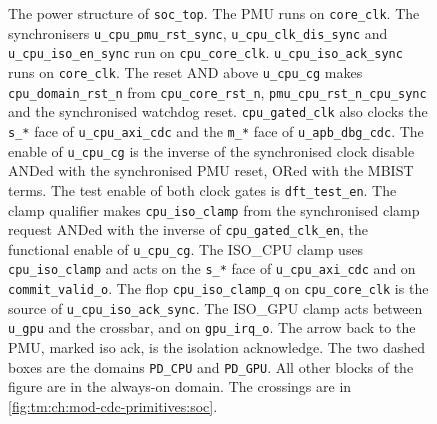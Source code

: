 \begin{figure}[ht]
{}
  \caption{The power structure of \texttt{soc\_top}. The PMU runs on \texttt{core\_clk}. The synchronisers \texttt{u\_cpu\_pmu\_rst\_sync}, \texttt{u\_cpu\_clk\_dis\_sync} and \texttt{u\_cpu\_iso\_en\_sync} run on \texttt{cpu\_core\_clk}. \texttt{u\_cpu\_iso\_ack\_sync} runs on \texttt{core\_clk}. The reset AND above \texttt{u\_cpu\_cg} makes \texttt{cpu\_domain\_rst\_n} from \texttt{cpu\_core\_rst\_n}, \texttt{pmu\_cpu\_rst\_n\_cpu\_sync} and the synchronised watchdog reset. \texttt{cpu\_gated\_clk} also clocks the \texttt{s\_*} face of \texttt{u\_cpu\_axi\_cdc} and the \texttt{m\_*} face of \texttt{u\_apb\_dbg\_cdc}. The enable of \texttt{u\_cpu\_cg} is the inverse of the synchronised clock disable ANDed with the synchronised PMU reset, ORed with the MBIST terms. The test enable of both clock gates is \texttt{dft\_test\_en}. The clamp qualifier makes \texttt{cpu\_iso\_clamp} from the synchronised clamp request ANDed with the inverse of \texttt{cpu\_gated\_clk\_en}, the functional enable of \texttt{u\_cpu\_cg}. The ISO\_CPU clamp uses \texttt{cpu\_iso\_clamp} and acts on the \texttt{s\_*} face of \texttt{u\_cpu\_axi\_cdc} and on \texttt{commit\_valid\_o}. The flop \texttt{cpu\_iso\_clamp\_q} on \texttt{cpu\_core\_clk} is the source of \texttt{u\_cpu\_iso\_ack\_sync}. The ISO\_GPU clamp acts between \texttt{u\_gpu} and the crossbar, and on \texttt{gpu\_irq\_o}. The arrow back to the PMU, marked iso ack, is the isolation acknowledge. The two dashed boxes are the domains \texttt{PD\_CPU} and \texttt{PD\_GPU}. All other blocks of the figure are in the always-on domain. The crossings are in \cref{fig:tm:ch:mod-cdc-primitives:soc}.}\label{fig:tm:ch:mod-power-management:soc}
\end{figure}

